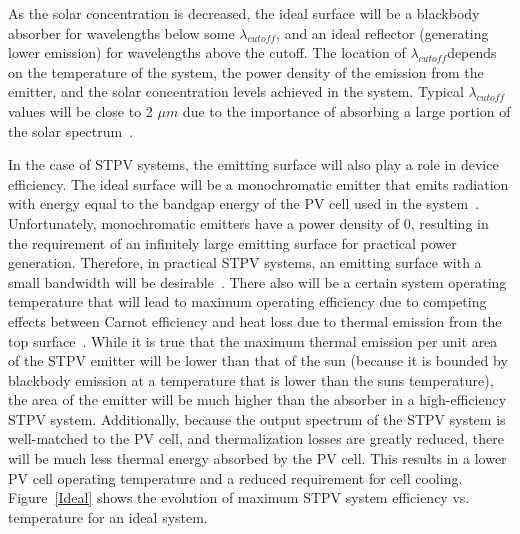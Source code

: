 \documentclass[review]{elsarticle}
\begin{document}
As the solar concentration is decreased, the ideal surface will be a
blackbody absorber for wavelengths below some $\lambda_{cutoff}$, and an
ideal reflector (generating lower emission) for wavelengths above the
cutoff.  The location of $\lambda_{cutoff}$depends on the temperature of
the system, the power density of the emission from the emitter, and the
solar concentration levels achieved in the system.  Typical
$\lambda_{cutoff}$ values will be close to 2 $\mu m$ due to the importance
of absorbing a large portion of the solar spectrum~\cite{RF_OptExp_2009}.

In the case of STPV systems, the emitting surface will also play a role in
device efficiency.  The ideal surface will be a monochromatic emitter that
emits radiation with energy equal to the bandgap energy of the PV cell
used in the system~\cite{TheoreticalEfficiency,L_AIP_2007}.
Unfortunately, monochromatic emitters have a power density of 0, resulting
in the requirement of an infinitely large emitting surface for practical
power generation.  Therefore, in practical STPV systems, an emitting
surface with a small bandwidth will be desirable~\cite{RF_OptExp_2009}.
There also will be a certain system operating
temperature that will lead to maximum operating efficiency due to
competing effects between Carnot efficiency and heat loss due to thermal
emission from the top surface~\cite{combineLuque,concentrationGleckman}.
While it is true that the maximum thermal emission per unit area of the
STPV emitter will be lower than that of the sun (because it is bounded by
blackbody emission at a temperature that is lower than the suns
temperature), the area of the emitter will be much higher than the
absorber in a high-efficiency STPV system.  
Additionally, because the output spectrum of the STPV system is
well-matched to the PV cell, and thermalization losses are greatly
reduced, there will be much less thermal energy absorbed by the PV cell.
This results in a lower PV cell operating temperature and a reduced
requirement for cell cooling.  Figure~\ref{Ideal} shows the evolution of
maximum STPV system efficiency vs. temperature for an ideal system.
\end{document}
